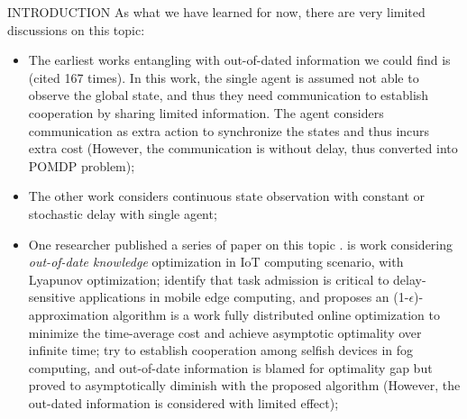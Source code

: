 \documentclass[10pt, conference, letterpaper]{IEEEtran}
\begin{document}
\begin{section}{INTRODUCTION}
        As what we have learned for now, there are very limited discussions on this topic:
        \begin{itemize}
            \item The earliest works entangling with out-of-dated information we could find is \cite{ref-01} (cited 167 times). In this work, the single agent is assumed not able to observe the global state, and thus they need communication to establish cooperation by sharing limited information. The agent considers communication as extra action to synchronize the states and thus incurs extra cost (However, the communication is without delay, thus converted into POMDP problem);
            \item The other work \cite{ref-02} considers continuous state observation with constant or stochastic delay with single agent;
            \item One researcher published a series of paper on this topic \cite{Lyu2017,Lyu2018,Lyu2018a,Lyu2018b}.
                \cite{Lyu2017} is work considering \emph{out-of-date knowledge} optimization in IoT computing scenario, with Lyapunov optimization;
                 \cite{Lyu2018} identify that task admission is critical to delay-sensitive applications in mobile edge computing, and proposes an (1-$\epsilon$)-approximation algorithm
                 \cite{Lyu2018a} is a work fully distributed online optimization to minimize the time-average cost and achieve asymptotic optimality over infinite time;
                \cite{Lyu2018b} try to establish cooperation among selfish devices in fog computing, and out-of-date information is blamed for optimality gap but proved to asymptotically diminish with the proposed algorithm (However, the out-dated information is considered with limited effect);
        \end{itemize}


\end{section}
\end{document}
